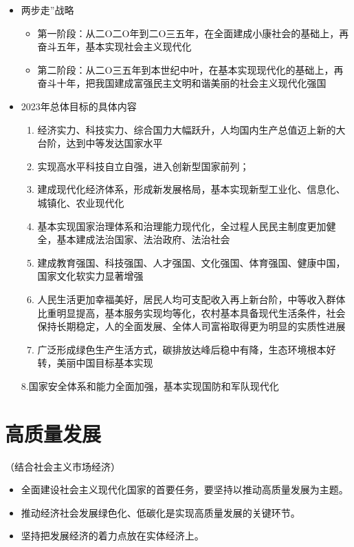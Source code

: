 \documentclass[12pt,openany]{ctexbook}
\begin{document}
\begin{itemize}
  \item 两步走”战略
\begin{itemize}
  \item 第一阶段：从二O二O年到二O三五年，在全面建成小康社会的基础上，再奋斗五年，基本实现社会主义现代化
  \item 第二阶段：从二O三五年到本世纪中叶，在基本实现现代化的基础上，再奋斗十年，把我国建成富强民主文明和谐美丽的社会主义现代化强国
\end{itemize}
  \item 2023年总体目标的具体内容
\begin{enumerate}
  \item 经济实力、科技实力、综合国力大幅跃升，人均国内生产总值迈上新的大台阶，达到中等发达国家水平
  \item 实现高水平科技自立自强，进入创新型国家前列；
  \item 建成现代化经济体系，形成新发展格局，基本实现新型工业化、信息化、城镇化、农业现代化
  \item 基本实现国家治理体系和治理能力现代化，全过程人民民主制度更加健全，基本建成法治国家、法治政府、法治社会
  \item 建成教育强国、科技强国、人才强国、文化强国、体育强国、健康中国，国家文化软实力显著增强
  \item 人民生活更加幸福美好，居民人均可支配收入再上新台阶，中等收入群体比重明显提高，基本服务实现均等化，农村基本具备现代生活条件，社会保持长期稳定，人的全面发展、全体人司富裕取得更为明显的实质性进展
  \item 广泛形成绿色生产生活方式，碳排放达峰后稳中有降，生态环境根本好转，美丽中国目标基本实现
\end{enumerate}
  \par 8.国家安全体系和能力全面加强，基本实现国防和军队现代化
\end{itemize}
\section{高质量发展}
（结合社会主义市场经济）
\begin{itemize}
  \item 全面建设社会主义现代化国家的首要任务，要坚持以推动高质量发展为主题。
  \item 推动经济社会发展绿色化、低碳化是实现高质量发展的关键环节。
  \item 坚持把发展经济的着力点放在实体经济上。
\end{itemize}
\end{document}
